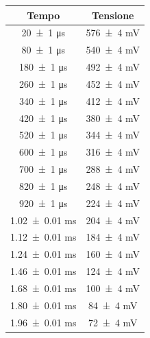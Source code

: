 \documentclass[a4paper]{article}
\begin{document}
\begin{appendices}
\begin{table}[htbp]
    \centering
    \begin{minipage}{0.48\textwidth}
        \centering\small %
        \begin{tabular}{|c|c|}
        \hline
        Tempo & Tensione \\\hline\hline
        \num{20 \pm 1} \si{\micro\second} & \num{576 \pm 4} \si{\milli\volt} \\
        \num{80 \pm 1} \si{\micro\second} & \num{540 \pm 4} \si{\milli\volt} \\
        \num{180 \pm 1} \si{\micro\second} & \num{492 \pm 4} \si{\milli\volt} \\
        \num{260 \pm 1} \si{\micro\second} & \num{452 \pm 4} \si{\milli\volt} \\
        \num{340 \pm 1} \si{\micro\second} & \num{412 \pm 4} \si{\milli\volt} \\
        \num{420 \pm 1} \si{\micro\second} & \num{380 \pm 4} \si{\milli\volt} \\
        \num{520 \pm 1} \si{\micro\second} & \num{344 \pm 4} \si{\milli\volt} \\
        \num{600 \pm 1} \si{\micro\second} & \num{316 \pm 4} \si{\milli\volt} \\
        \num{700 \pm 1} \si{\micro\second} & \num{288 \pm 4} \si{\milli\volt} \\
        \num{820 \pm 1} \si{\micro\second} & \num{248 \pm 4} \si{\milli\volt} \\
        \num{920 \pm 1} \si{\micro\second} & \num{224 \pm 4} \si{\milli\volt} \\
        \num{1.02 \pm 0.01} \si{\milli\second} & \num{204 \pm 4} \si{\milli\volt} \\ %
        \num{1.12 \pm 0.01} \si{\milli\second} & \num{184 \pm 4} \si{\milli\volt} \\
        \num{1.24 \pm 0.01} \si{\milli\second} & \num{160 \pm 4} \si{\milli\volt} \\
        \num{1.46 \pm 0.01} \si{\milli\second} & \num{124 \pm 4} \si{\milli\volt} \\
        \num{1.68 \pm 0.01} \si{\milli\second} & \num{100 \pm 4} \si{\milli\volt} \\
        \num{1.80 \pm 0.01} \si{\milli\second} & \num{84 \pm 4} \si{\milli\volt} \\
        \num{1.96 \pm 0.01} \si{\milli\second} & \num{72 \pm 4} \si{\milli\volt} \\

\end{tabular}
\end{minipage}
\end{table}
\end{appendices}
\end{document}
